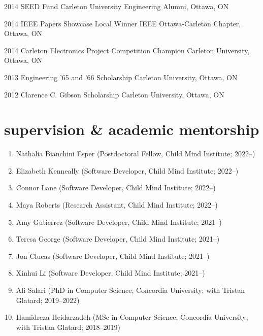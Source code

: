 \documentclass[]{friggeri-cv} %
\begin{document}
\begin{entrylist}
\entry
{2014}
{SEED Fund}
{Carleton University Engineering Alumni, Ottawa, ON}
{}
\vspace{-7pt}

\entry
{2014}
{IEEE Papers Showcase Local Winner}
{IEEE Ottawa-Carleton Chapter, Ottawa, ON}
{}
\vspace{-7pt}

\entry
{2014}
{Carleton Electronics Project Competition Champion}
{Carleton University, Ottawa, ON}
{}
\vspace{-7pt}

\entry
{2013}
{Engineering '65 and '66 Scholarship}
{Carleton University, Ottawa, ON}
{}
\vspace{-7pt}

\entry
{2012}
{Clarence C. Gibson Scholarship}
{Carleton University, Ottawa, ON}
{}
\vspace{-7pt}
\end{entrylist}

\section{supervision \& academic mentorship}
\begin{enumerate}
\item Nathalia Bianchini Esper (Postdoctoral Fellow, Child Mind Institute; 2022–)
\item Elizabeth Kenneally (Software Developer, Child Mind Institute; 2022–)
\item Connor Lane (Software Developer, Child Mind Institute; 2022–)
\item Maya Roberts (Research Assistant, Child Mind Institute; 2022–)
\item Amy Gutierrez (Software Developer, Child Mind Institute; 2021–)
\item Teresa George (Software Developer, Child Mind Institute; 2021–)
\item Jon Clucas (Software Developer, Child Mind Institute; 2021–)
\item Xinhui Li (Software Developer, Child Mind Institute; 2021–)
\item Ali Salari (PhD in Computer Science, Concordia University; with Tristan Glatard; 2019–2022)
\item Hamidreza Heidarzadeh (MSc in Computer Science, Concordia University; with Tristan Glatard; 2018–2019)
\end{enumerate}
\end{document}
